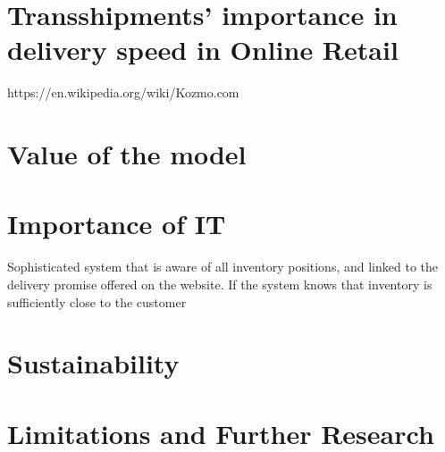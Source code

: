 \documentclass[../../main.tex]{subfiles}
\begin{document}
\section{Transshipments' importance in delivery speed in Online Retail}
https://en.wikipedia.org/wiki/Kozmo.com

\section{Value of the model}

\section{Importance of IT}
Sophisticated system that is aware of all inventory positions, and linked to the delivery promise offered on the website. If the system knows that inventory is sufficiently close to the customer

\section{Sustainability}

\section{Limitations and Further Research}

\end{document}
